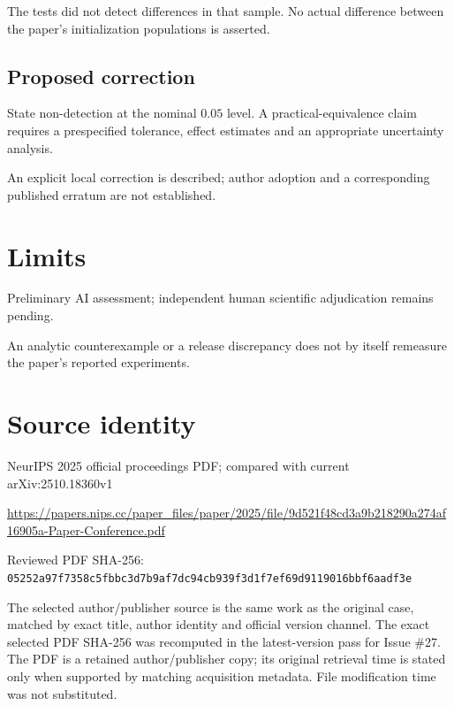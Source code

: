\documentclass[11pt]{article}
\begin{document}
The tests did not detect differences in that sample. No actual difference between the paper’s initialization populations is asserted.

\subsection*{Proposed correction}

State non-detection at the nominal \(0.05\) level. A practical-equivalence claim requires a prespecified tolerance, effect estimates and an appropriate uncertainty analysis.

An explicit local correction is described; author adoption and a corresponding published erratum are not established.

\section*{Limits}

Preliminary AI assessment; independent human scientific adjudication remains pending.\par

An analytic counterexample or a release discrepancy does not by itself remeasure the paper’s reported experiments.\par

\section*{Source identity}

NeurIPS 2025 official proceedings PDF; compared with current arXiv:2510.18360v1

\url{https://papers.nips.cc/paper_files/paper/2025/file/9d521f48cd3a9b218290a274af16905a-Paper-Conference.pdf}

Reviewed PDF SHA-256: \nolinkurl{05252a97f7358c5fbbc3d7b9af7dc94cb939f3d1f7ef69d9119016bbf6aadf3e}

The selected author/publisher source is the same work as the original case, matched by exact title, author identity and official version channel. The exact selected PDF SHA-256 was recomputed in the latest-version pass for Issue \#27. The PDF is a retained author/publisher copy; its original retrieval time is stated only when supported by matching acquisition metadata. File modification time was not substituted.
\end{document}
